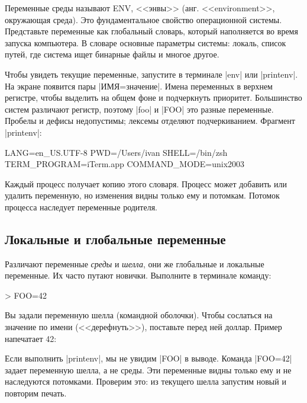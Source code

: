 Переменные среды называют ENV, <<энвы>> (анг. <<environment>>, окружающая
среда). Это фундаментальное свойство операционной системы. Представьте
переменные как глобальный словарь, который наполняется во время запуска
компьютера. В словаре основные параметры системы: локаль, список путей, где
система ищет бинарные файлы и многое другое.

Чтобы увидеть текущие переменные, запустите в терминале \spverb|env| или
\spverb|printenv|. На экране появится пары \spverb|ИМЯ=значение|. Имена
переменных в верхнем регистре, чтобы выделить на общем фоне и подчеркнуть
приоритет. Большинство систем различают регистр, поэтому \spverb|foo| и
\spverb|FOO| это разные переменные. Пробелы и дефисы недопустимы; лексемы
отделяют подчеркиванием. Фрагмент \spverb|printenv|:

\begin{english}
  \begin{bash}
LANG=en_US.UTF-8
PWD=/Users/ivan
SHELL=/bin/zsh
TERM_PROGRAM=iTerm.app
COMMAND_MODE=unix2003
  \end{bash}
\end{english}

Каждый процесс получает копию этого словаря. Процесс может добавить или удалить
переменную, но изменения видны только ему и потомкам. Потомок процесса наследует
переменные родителя.

\subsection{Локальные и глобальные переменные}

Различают переменные \emph{среды} и \emph{шелла}, они же глобальные и локальные
переменные. Их часто путают новички. Выполните в терминале команду:

\begin{english}
  \begin{bash}
> FOO=42
  \end{bash}
\end{english}

Вы задали переменную шелла (командной оболочки). Чтобы сослаться на значение по
имени (<<дерефнуть>>), поставьте перед ней доллар. Пример напечатает 42:

\begin{english}
\end{english}

Если выполнить \spverb|printenv|, мы не увидим \spverb|FOO| в выводе. Команда
\spverb|FOO=42| задает переменную шелла, а не среды. Эти переменные видны только
ему и не наследуются потомками. Проверим это: из текущего шелла запустим новый и
повторим печать.

